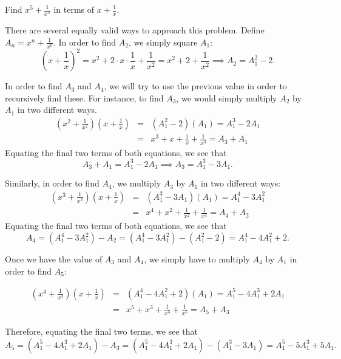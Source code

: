 \begin{exmp} Find $\displaystyle x^5+\frac{1}{x^5}$ in terms of $\displaystyle x+\frac{1}{x}$.  \end{exmp}
\begin{soln}  There are several equally valid ways to approach this problem.  Define $\displaystyle A_n=x^n+\frac{1}{x^n}$.  In order to find $A_2$, we simply square $A_1$:  $$\left(x+\frac{1}{x}\right)^2=x^2+2\cdot x\cdot \frac{1}{x}+\frac{1}{x^2}=x^2+2+\frac{1}{x^2}\implies A_2=A_1^2-2.$$

In order to find $A_3$ and $A_4$, we will try to use the previous value in order to recursively find these.  For instance, to find $A_3$, we would simply multiply $A_2$ by $A_1$ in two different ways.     \begin{eqnarray*} \left(x^2+\frac{1}{x^2}\right)\left(x+\frac{1}{x}\right)&=&\left(A_1^2-2\right)\left(A_1\right)=A_1^3-2A_1 \\  &=& x^3+x+\frac{1}{x}+\frac{1}{x^3}=A_3+A_1   \end{eqnarray*}
Equating the final two terms of both equations, we see that $$A_3+A_1=A_1^3-2A_1\implies A_3=A_1^3-3A_1.$$

Similarly, in order to find $A_4$, we multiply $A_3$ by $A_1$ in two different ways: 
\begin{eqnarray*}  \left(x^3+\frac{1}{x^3}\right)\left(x+\frac{1}{x}\right)&=&\left(A_1^3-3A_1\right)\left(A_1\right)=A_1^4-3A_1^2 \\ &=& x^4+x^2+\frac{1}{x^2}+\frac{1}{x^4}=A_4+A_2 \end{eqnarray*}
Equating the final two terms of both equations, we see that  $$A_4=\left(A_1^4-3A_1^2\right)-A_2=\left(A_1^4-3A_1^2\right)-\left(A_1^2-2\right)=A_1^4-4A_1^2+2.$$

Once we have the value of $A_3$ and $A_4$, we simply have to multiply $A_4$ by $A_1$ in order to find $A_5$:  

\begin{eqnarray*}  
	\left(x^4+\frac{1}{x^4}\right)\left(x+\frac1x\right)&=&\left(A_1^4-4A_1^2+2\right)\left(A_1\right)=A_1^5-4A_1^3+2A_1 \\ &=& x^5+x^3+\frac{1}{x^3}+\frac{1}{x^5}=A_5+A_3 \end{eqnarray*}

Therefore, equating the final two terms, we see that $$A_5=\left(A_1^5-4A_1^3+2A_1\right)-A_3=\left(A_1^5-4A_1^3+2A_1\right)-\left(A_1^3-3A_1\right)=\boxed{A_1^5-5A_1^3+5A_1}.$$

\end{soln}

